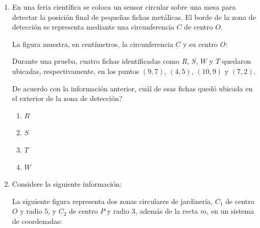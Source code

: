 \documentclass[11pt]{article}
\begin{document}
\begin{enumerate}[label=\textbf{\arabic*.}, itemsep=2.5cm]
\Needspace{0.90\textheight}
\item
En una feria cient\'ifica se coloca un sensor circular sobre una mesa para detectar la posici\'on final de peque\~nas fichas met\'alicas. El borde de la zona de detecci\'on se representa mediante una circunferencia $C$ de centro $O$.

La figura muestra, en cent\'imetros, la circunferencia $C$ y su centro $O$:

\begin{center}
\end{center}

Durante una prueba, cuatro fichas identificadas como $R$, $S$, $W$ y $T$ quedaron ubicadas, respectivamente, en los puntos $(9,7)$, $(4,5)$, $(10,9)$ y $(7,2)$.

De acuerdo con la informaci\'on anterior, \textquestiondown cu\'al de esas fichas qued\'o ubicada en el exterior de la zona de detecci\'on?

\begin{enumerate}[label=\Alph*)]
  \item $R$
  \item $S$
  \item $T$
  \item $W$
\end{enumerate}

\Needspace{0.96\textheight}
\item
Considere la siguiente informaci\'on:

La siguiente figura representa dos zonas circulares de jardiner\'ia, $C_1$ de centro $O$ y radio $5$, y $C_2$ de centro $P$ y radio $3$, adem\'as de la recta $m$, en un sistema de coordenadas:


\end{enumerate}
\end{document}
